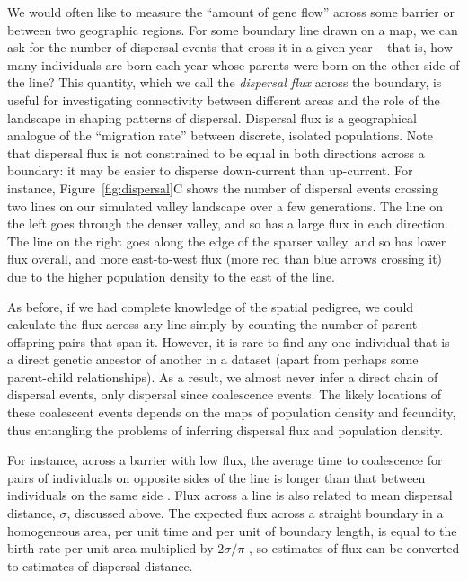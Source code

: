 \documentclass{ar-1col}
\renewcommand{\emph}[1]{{\textit{#1}}}
\begin{document}
{We would often like to measure the ``amount of gene flow'' across some barrier
or between two geographic regions.
For some boundary line drawn on a map,
we can ask for the number of dispersal events that cross it in a given year -- 
that is, 
how many individuals are born each year whose parents
were born on the other side of the line?
This quantity, which we call the \emph{dispersal flux} across the boundary,
is useful for investigating connectivity between different areas
and the role of the landscape in shaping patterns of dispersal.
Dispersal flux is a geographical analogue of
the ``migration rate'' between discrete, isolated populations. 
Note that dispersal flux is not constrained to be equal in both directions across a boundary:
it may be easier to disperse down-current than up-current.
For instance, Figure~\ref{fig:dispersal}C
shows the number of dispersal events crossing two lines on our simulated valley landscape
over a few generations.
The line on the left goes through the denser valley, 
and so has a large flux in each direction.
The line on the right goes along the edge of the sparser valley,
and so has lower flux overall, and more east-to-west flux 
(more red than blue arrows crossing it)
due to the higher population density to the east of the line.

As before, if we had complete knowledge of the spatial pedigree,
we could calculate the flux across any line simply by counting the number of
parent-offspring pairs that span it.
However, it is rare to find any one individual
that is a direct genetic ancestor of another in a dataset
(apart from perhaps some parent-child relationships).
As a result, we almost never infer a direct chain of dispersal events,
only dispersal since coalescence events.
The likely locations of these coalescent events
depends on the maps of population density and fecundity,
thus entangling
the problems of inferring dispersal flux and population density.

For instance, across a barrier with low flux,
the average time to coalescence for pairs of individuals on opposite sides of the line
is longer than that between individuals on the same side \citep{bedassle,Duforet-Frebourg_Blum_2014,ringbauer2018estimating}.
Flux across a line is also related to mean dispersal distance, $\sigma$, discussed above.
The expected flux across a straight boundary in a homogeneous area,
per unit time and per unit of boundary length,
is equal to the birth rate per unit area multiplied by $2 \sigma / \pi$
\citep[where $\pi$ is the mathematical constant,][]{buffon1777},
so estimates of flux can be converted to estimates of dispersal distance.


}
\end{document}
